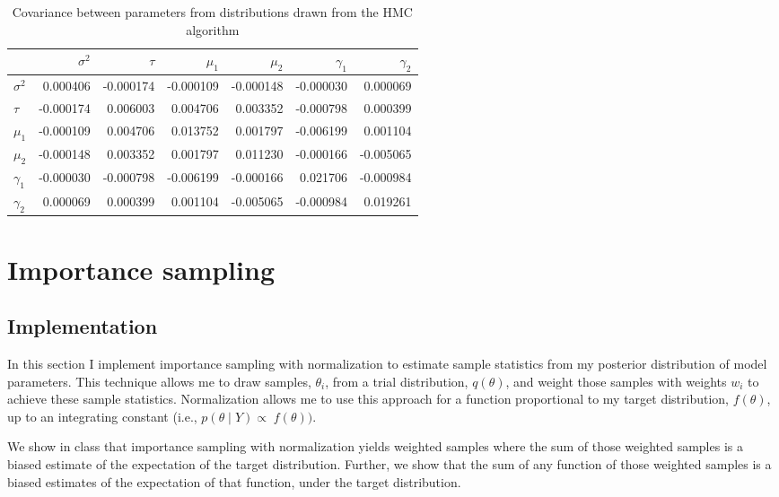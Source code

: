 \documentclass{article}
\begin{document}
\begin{table}[H]
  \begin{center}
    \begin{tabular}{lrrrrrr}
      {} & $\sigma^2$ & $\tau$ & $\mu_1$ & $\mu_2$ & $\gamma_1$ & $\gamma_2$ \\
      \midrule
      $\sigma^2$   &  0.000406 & -0.000174 & -0.000109 & -0.000148 & -0.000030 &  0.000069 \\
      $\tau$  & -0.000174 &  0.006003 &  0.004706 &  0.003352 & -0.000798 &  0.000399 \\
      $\mu_1$  & -0.000109 &  0.004706 &  0.013752 &  0.001797 & -0.006199 &  0.001104 \\
      $\mu_2$  & -0.000148 &  0.003352 &  0.001797 &  0.011230 & -0.000166 & -0.005065 \\
      $\gamma_1$ & -0.000030 & -0.000798 & -0.006199 & -0.000166 &  0.021706 & -0.000984 \\
      $\gamma_2$ &  0.000069 &  0.000399 &  0.001104 & -0.005065 & -0.000984 &  0.019261 \\
      \bottomrule
      \end{tabular}
  \end{center}
  \caption{\label{tab:hmc_covar} Covariance between parameters from distributions drawn from the HMC algorithm}
\end{table}


\section{Importance sampling}
\subsection{Implementation}
In this section I implement importance sampling with normalization to estimate sample statistics from my posterior distribution of model parameters. This technique allows me to draw samples, $\theta_i$, from a trial distribution, $q(\theta)$, and weight those samples with weights $w_i$ to achieve these sample statistics. Normalization allows me to use this approach for a function proportional to my target distribution, $f(\theta)$, up to an integrating constant (i.e., $p(\theta \mid Y) \propto\; f(\theta))$.

We show in class that importance sampling with normalization yields weighted samples where the sum of those weighted samples is a biased estimate of the expectation of the target distribution. Further, we show that the sum of any function of those weighted samples is a biased estimates of the expectation of that function, under the target distribution.
\end{document}
